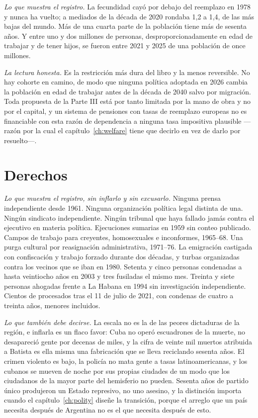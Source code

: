 \emph{Lo que muestra el registro.} La fecundidad cayó por debajo del reemplazo en
1978 y nunca ha vuelto; a mediados de la década de 2020 rondaba 1,2 a 1,4, de las
más bajas del mundo.\unv{} Más de una cuarta parte de la población tiene más de
sesenta años. Y entre uno y dos millones de personas, desproporcionadamente en edad
de trabajar y de tener hijos, se fueron entre 2021 y 2025 de una población de once
millones.

\emph{La lectura honesta.} Es la restricción más dura del libro y la menos
reversible. No hay cohorte en camino, de modo que ninguna política adoptada en 2026
cambia la población en edad de trabajar antes de la década de 2040 salvo por
migración. Toda propuesta de la Parte III está por tanto limitada por la mano de
obra y no por el capital, y un sistema de pensiones con tasas de reemplazo europeas
no es financiable con esta razón de dependencia a ninguna tasa impositiva plausible
---razón por la cual el capítulo~\ref{ch:welfare} tiene que decirlo en vez de darlo
por resuelto---.

\section{Derechos}

\emph{Lo que muestra el registro, sin inflarlo y sin excusarlo.} Ninguna prensa
independiente desde 1961. Ninguna organización política legal distinta de una.
Ningún sindicato independiente. Ningún tribunal que haya fallado jamás contra el
ejecutivo en materia política. Ejecuciones sumarias en 1959 sin conteo publicado.
Campos de trabajo para creyentes, homosexuales e inconformes, 1965--68. Una purga
cultural por reasignación administrativa, 1971--76. La emigración castigada con
confiscación y trabajo forzado durante dos décadas, y turbas organizadas contra los
vecinos que se iban en 1980. Setenta y cinco personas condenadas a hasta veintiocho
años en 2003 y tres fusiladas el mismo mes. Treinta y siete personas ahogadas frente
a La Habana en 1994 sin investigación independiente. Cientos de procesados tras el
11 de julio de 2021, con condenas de cuatro a treinta años, menores incluidos.

\emph{Lo que también debe decirse.} La escala no es la de las peores dictaduras de
la región, e inflarla es un flaco favor: Cuba no operó escuadrones de la muerte, no
desapareció gente por decenas de miles, y la cifra de veinte mil muertos atribuida a
Batista es ella misma una fabricación que se lleva reciclando sesenta años. El
crimen violento es bajo, la policía no mata gente a tasas latinoamericanas, y los
cubanos se mueven de noche por sus propias ciudades de un modo que los ciudadanos de
la mayor parte del hemisferio no pueden. Sesenta años de partido único produjeron un
Estado represivo, no uno asesino, y la distinción importa cuando el
capítulo~\ref{ch:polity} diseñe la transición, porque el arreglo que un país
necesita después de Argentina no es el que necesita después de esto.


